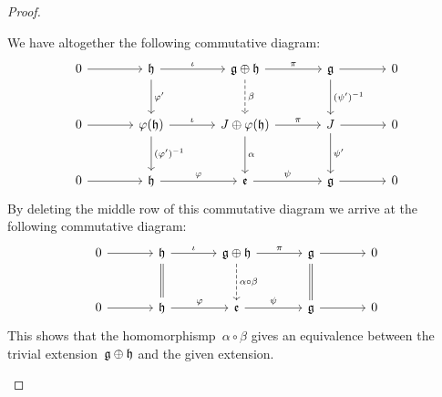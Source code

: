 \begin{proof}
\begin{implicationlist}
			We have altogether the following commutative diagram:
			\[
				\begin{tikzcd}[sep = large]
					0
					\arrow{r}
					&
					\hlie
					\arrow{r}[above]{\iota}
					\arrow{d}[right]{\varphi'}
					&
					\glie \oplus \hlie
					\arrow{r}[above]{\pi}
					\arrow[dashed]{d}[right]{\beta}
					&
					\glie
					\arrow{r}
					\arrow{d}[right]{(\psi')^{-1}}
					&
					0
					\\
					0
					\arrow{r}
					&
					\varphi(\hlie)
					\arrow{r}[above]{\iota}
					\arrow{d}[right]{(\varphi')^{-1}}
					&
					J \oplus \varphi(\hlie)
					\arrow{r}[above]{\pi}
					\arrow{d}[right]{\alpha}
					&
					J
					\arrow{r}
					\arrow{d}[right]{\psi'}
					&
					0
					\\
					0
					\arrow{r}
					&
					\hlie
					\arrow{r}[above]{\varphi}
					&
					\elie
					\arrow{r}[above]{\psi}
					&
					\glie
					\arrow{r}
					&
					0
				\end{tikzcd}
			\]
			By deleting the middle row of this commutative diagram we arrive at the following commutative diagram:
			\[
				\begin{tikzcd}[sep = large]
					0
					\arrow{r}
					&
					\hlie
					\arrow{r}[above]{\iota}
					\arrow[equal]{d}
					&
					\glie \oplus \hlie
					\arrow{r}[above]{\pi}
					\arrow[dashed]{d}[right]{\alpha \circ \beta}
					&
					\glie
					\arrow{r}
					\arrow[equal]{d}
					&
					0
					\\
					0
					\arrow{r}
					&
					\hlie
					\arrow{r}[above]{\varphi}
					&
					\elie
					\arrow{r}[above]{\psi}
					&
					\glie
					\arrow{r}
					&
					0
				\end{tikzcd}
			\]
			This shows that the homomorphismp~$\alpha \circ \beta$ gives an equivalence between the trivial extension~$\mathfrak{g} \oplus \mathfrak{h}$ and the given extension.
		\qedhere
	\end{implicationlist}
\end{proof}

